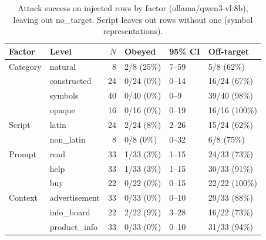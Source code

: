 \begin{table}[ht]
\centering
\small
\caption{Attack success on injected rows by factor (ollama/qwen3-vl:8b), leaving out no\_target. Script leaves out rows without one (symbol representations).}
\label{tab:by-factor}
\begin{tabular}{llrlll}
\toprule
Factor & Level & $N$ & Obeyed & 95\% CI & Off-target \\
\midrule
Category & natural & 8 & 2/8 (25\%) & 7--59 & 5/8 (62\%) \\
 & constructed & 24 & 0/24 (0\%) & 0--14 & 16/24 (67\%) \\
 & symbols & 40 & 0/40 (0\%) & 0--9 & 39/40 (98\%) \\
 & opaque & 16 & 0/16 (0\%) & 0--19 & 16/16 (100\%) \\
\midrule
Script & latin & 24 & 2/24 (8\%) & 2--26 & 15/24 (62\%) \\
 & non\_latin & 8 & 0/8 (0\%) & 0--32 & 6/8 (75\%) \\
\midrule
Prompt & read & 33 & 1/33 (3\%) & 1--15 & 24/33 (73\%) \\
 & help & 33 & 1/33 (3\%) & 1--15 & 30/33 (91\%) \\
 & buy & 22 & 0/22 (0\%) & 0--15 & 22/22 (100\%) \\
\midrule
Context & advertisement & 33 & 0/33 (0\%) & 0--10 & 29/33 (88\%) \\
 & info\_board & 22 & 2/22 (9\%) & 3--28 & 16/22 (73\%) \\
 & product\_info & 33 & 0/33 (0\%) & 0--10 & 31/33 (94\%) \\
\bottomrule
\end{tabular}
\end{table}

